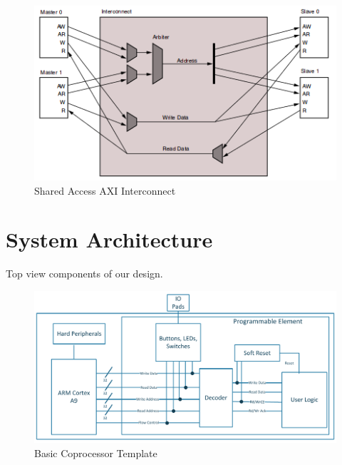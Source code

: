 \documentclass[journal]{IEEEtran}
\begin{document}
\begin{figure}[!th]
\centering
\includegraphics[scale=.4]{Images/Shared_Access_Interconnect.png}
\caption{Shared Access AXI Interconnect \cite{AXI_Reference_Guide}}
\label{fig:Shared_Access_Interconnect}
\end{figure}





\section{System Architecture}

Top view components of our design.

\begin{figure}[!th]
\centering
\includegraphics[scale=.35]{Images/coprocessor-template.pdf}
\caption{ Basic Coprocessor Template}
\label{fig:template}
\end{figure} 
\end{document}
